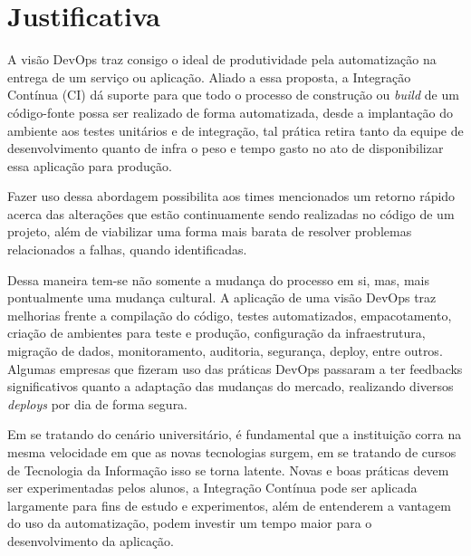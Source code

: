 \chapter{Justificativa}\label{cap: justificativa}

A visão DevOps traz consigo o ideal de produtividade pela automatização na entrega de um serviço ou aplicação. Aliado a essa proposta, a Integração Contínua (CI) dá suporte para que todo o processo de construção ou \textit{build} de um código-fonte possa ser realizado de forma automatizada, desde a implantação do ambiente aos testes unitários e de integração, tal prática retira tanto da equipe de desenvolvimento quanto de infra o peso e tempo gasto no ato de disponibilizar essa aplicação para produção\cite{nathan2017}.

Fazer uso dessa abordagem possibilita aos times mencionados um retorno rápido acerca das alterações que estão continuamente sendo realizadas no código de um projeto, além de viabilizar uma forma mais barata de resolver problemas relacionados a falhas, quando identificadas.

Dessa maneira tem-se não somente a mudança do processo em si, mas, mais pontualmente uma mudança cultural. A aplicação de uma visão DevOps traz melhorias frente a compilação do código, testes automatizados, empacotamento, criação de ambientes para teste e produção, configuração da infraestrutura, migração de dados, monitoramento, auditoria, segurança, deploy, entre outros. Algumas empresas que fizeram uso das práticas DevOps passaram a ter feedbacks significativos quanto a adaptação das mudanças do mercado, realizando diversos \textit{deploys} por dia de forma segura.\cite{sato2014devops}

Em se tratando do cenário universitário, é fundamental que a instituição corra na mesma velocidade em que as novas tecnologias surgem, em se tratando de cursos de Tecnologia da Informação isso se torna latente. Novas e boas práticas devem ser experimentadas pelos alunos, a Integração Contínua pode ser aplicada largamente para fins de estudo e experimentos, além de entenderem a vantagem do uso da automatização, podem investir um tempo maior para o desenvolvimento da aplicação.